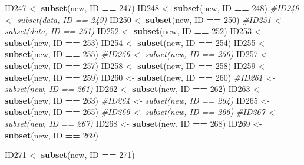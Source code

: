 \documentclass[
]{book}
\newenvironment{Shaded}{\begin{snugshade}}{\end{snugshade}}
\newcommand{\CommentTok}[1]{\textcolor[rgb]{0.56,0.35,0.01}{\textit{#1}}}
\newcommand{\DecValTok}[1]{\textcolor[rgb]{0.00,0.00,0.81}{#1}}
\newcommand{\KeywordTok}[1]{\textcolor[rgb]{0.13,0.29,0.53}{\textbf{#1}}}
\newcommand{\NormalTok}[1]{#1}
\newcommand{\OperatorTok}[1]{\textcolor[rgb]{0.81,0.36,0.00}{\textbf{#1}}}
\newcommand{\StringTok}[1]{\textcolor[rgb]{0.31,0.60,0.02}{#1}}
\begin{document}
\begin{Shaded}
\begin{Highlighting}[]
{{{{{{\NormalTok{ID247 <-}\StringTok{ }\KeywordTok{subset}\NormalTok{(new, ID }\OperatorTok{==}\StringTok{ }\DecValTok{247}\NormalTok{)}
\NormalTok{ID248 <-}\StringTok{ }\KeywordTok{subset}\NormalTok{(new, ID }\OperatorTok{==}\StringTok{ }\DecValTok{248}\NormalTok{)}
\CommentTok{#ID249 <- subset(data, ID == 249)}
\NormalTok{ID250 <-}\StringTok{ }\KeywordTok{subset}\NormalTok{(new, ID }\OperatorTok{==}\StringTok{ }\DecValTok{250}\NormalTok{)}
\CommentTok{#ID251 <- subset(data, ID == 251)}
\NormalTok{ID252 <-}\StringTok{ }\KeywordTok{subset}\NormalTok{(new, ID }\OperatorTok{==}\StringTok{ }\DecValTok{252}\NormalTok{)}
\NormalTok{ID253 <-}\StringTok{ }\KeywordTok{subset}\NormalTok{(new, ID }\OperatorTok{==}\StringTok{ }\DecValTok{253}\NormalTok{)}
\NormalTok{ID254 <-}\StringTok{ }\KeywordTok{subset}\NormalTok{(new, ID }\OperatorTok{==}\StringTok{ }\DecValTok{254}\NormalTok{)}
\NormalTok{ID255 <-}\StringTok{ }\KeywordTok{subset}\NormalTok{(new, ID }\OperatorTok{==}\StringTok{ }\DecValTok{255}\NormalTok{)}
\CommentTok{#ID256 <- subset(new, ID == 256)}
\NormalTok{ID257 <-}\StringTok{ }\KeywordTok{subset}\NormalTok{(new, ID }\OperatorTok{==}\StringTok{ }\DecValTok{257}\NormalTok{)}
\NormalTok{ID258 <-}\StringTok{ }\KeywordTok{subset}\NormalTok{(new, ID }\OperatorTok{==}\StringTok{ }\DecValTok{258}\NormalTok{)}
\NormalTok{ID259 <-}\StringTok{ }\KeywordTok{subset}\NormalTok{(new, ID }\OperatorTok{==}\StringTok{ }\DecValTok{259}\NormalTok{)}
\NormalTok{ID260 <-}\StringTok{ }\KeywordTok{subset}\NormalTok{(new, ID }\OperatorTok{==}\StringTok{ }\DecValTok{260}\NormalTok{)}
\CommentTok{#ID261 <- subset(new, ID == 261)}
\NormalTok{ID262 <-}\StringTok{ }\KeywordTok{subset}\NormalTok{(new, ID }\OperatorTok{==}\StringTok{ }\DecValTok{262}\NormalTok{)}
\NormalTok{ID263 <-}\StringTok{ }\KeywordTok{subset}\NormalTok{(new, ID }\OperatorTok{==}\StringTok{ }\DecValTok{263}\NormalTok{)}
\CommentTok{#ID264 <- subset(new, ID == 264)}
\NormalTok{ID265 <-}\StringTok{ }\KeywordTok{subset}\NormalTok{(new, ID }\OperatorTok{==}\StringTok{ }\DecValTok{265}\NormalTok{)}
\CommentTok{#ID266 <- subset(new, ID == 266)}
\CommentTok{#ID267 <- subset(new, ID == 267)}
\NormalTok{ID268 <-}\StringTok{ }\KeywordTok{subset}\NormalTok{(new, ID }\OperatorTok{==}\StringTok{ }\DecValTok{268}\NormalTok{)}
\NormalTok{ID269 <-}\StringTok{ }\KeywordTok{subset}\NormalTok{(new, ID }\OperatorTok{==}\StringTok{ }\DecValTok{269}\NormalTok{)}

\NormalTok{ID271 <-}\StringTok{ }\KeywordTok{subset}\NormalTok{(new, ID }\OperatorTok{==}\StringTok{ }\DecValTok{271}\NormalTok{)}

}}}}}}
\end{Highlighting}
\end{Shaded}
\end{document}

